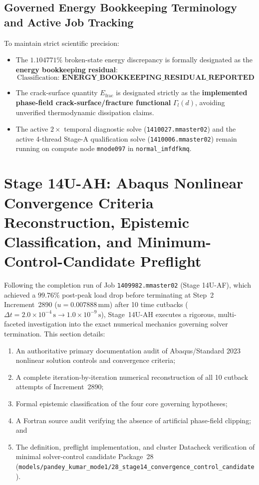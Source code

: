 \subsection{Governed Energy Bookkeeping Terminology and Active Job Tracking}
\label{subsec:stage14uag_terminology_jobs}

To maintain strict scientific precision:
\begin{itemize}
  \item The $1.104771\%$ broken-state energy discrepancy is formally designated as the \textbf{energy bookkeeping residual}:
  \begin{equation}
    \text{Classification: } \mathbf{ENERGY\_BOOKKEEPING\_RESIDUAL\_REPORTED}
  \end{equation}
  \item The crack-surface quantity $E_{\mathrm{frac}}$ is designated strictly as the \textbf{implemented phase-field crack-surface/fracture functional} $\Gamma_l(d)$, avoiding unverified thermodynamic dissipation claims.
  \item The active $2\times$ temporal diagnostic solve (\texttt{1410027.mmaster02}) and the active 4-thread Stage-A qualification solve (\texttt{1410006.mmaster02}) remain running on compute node \texttt{mnode097} in \texttt{normal\_imfdfkmq}.
\end{itemize}

\section{Stage 14U-AH: Abaqus Nonlinear Convergence Criteria Reconstruction, Epistemic Classification, and Minimum-Control-Candidate Preflight}
\label{sec:stage14uah_convergence_reconstruction}

Following the completion run of Job \texttt{1409982.mmaster02} (Stage 14U-AF), which achieved a $99.76\%$ post-peak load drop before terminating at Step~2 Increment~2890 ($u = 0.007888\,\mathrm{mm}$) after 10 time cutbacks ($\Delta t = 2.0\times 10^{-4}\,\mathrm{s} \to 1.0\times 10^{-9}\,\mathrm{s}$), Stage~14U-AH executes a rigorous, multi-faceted investigation into the exact numerical mechanics governing solver termination. This section details:
\begin{enumerate}
  \item An authoritative primary documentation audit of Abaqus/Standard 2023 nonlinear solution controls and convergence criteria;
  \item A complete iteration-by-iteration numerical reconstruction of all 10 cutback attempts of Increment~2890;
  \item Formal epistemic classification of the four core governing hypotheses;
  \item A Fortran source audit verifying the absence of artificial phase-field clipping; and
  \item The definition, preflight implementation, and cluster Datacheck verification of minimal solver-control candidate Package~28 (\texttt{models/pandey\_kumar\_mode1/28\_stage14\_convergence\_control\_candidate}).
\end{enumerate}

